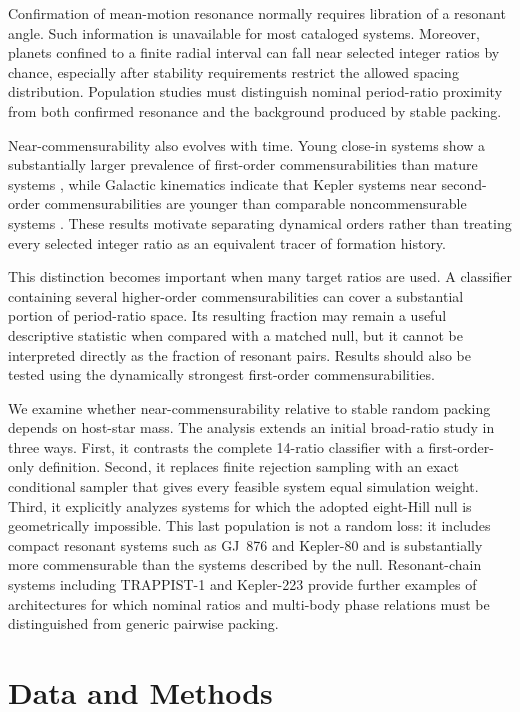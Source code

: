 \documentclass[twocolumn,linenumbers]{aastex631}
\begin{document}
Confirmation of mean-motion resonance normally requires libration of a
resonant angle. Such information is unavailable for most cataloged systems.
Moreover, planets confined to a finite radial interval can fall near selected
integer ratios by chance, especially after stability requirements restrict the
allowed spacing distribution. Population studies must distinguish nominal
period-ratio proximity from both confirmed resonance and the background
produced by stable packing.

Near-commensurability also evolves with time. Young close-in systems show a
substantially larger prevalence of first-order commensurabilities than mature
systems \citep{dai2024}, while Galactic kinematics indicate that Kepler
systems near second-order commensurabilities are younger than comparable
noncommensurable systems \citep{hamer2024}. These results motivate separating
dynamical orders rather than treating every selected integer ratio as an
equivalent tracer of formation history.

This distinction becomes important when many target ratios are used. A
classifier containing several higher-order commensurabilities can cover a
substantial portion of period-ratio space. Its resulting fraction may remain a
useful descriptive statistic when compared with a matched null, but it cannot
be interpreted directly as the fraction of resonant pairs. Results should also
be tested using the dynamically strongest first-order commensurabilities.

We examine whether near-commensurability relative to stable random packing
depends on host-star mass. The analysis extends an initial broad-ratio study in
three ways. First, it contrasts the complete 14-ratio classifier with a
first-order-only definition. Second, it replaces finite rejection sampling with
an exact conditional sampler that gives every feasible system equal simulation
weight. Third, it explicitly analyzes systems for which the adopted eight-Hill
null is geometrically impossible. This last population is not a random loss:
it includes compact resonant systems such as GJ~876 \citep{rivera2010} and
Kepler-80 \citep{macdonald2016} and is substantially more commensurable than
the systems described by the null. Resonant-chain systems including
TRAPPIST-1 \citep{luger2017} and Kepler-223 \citep{mills2016} provide further
examples of architectures for which nominal ratios and multi-body phase
relations must be distinguished from generic pairwise packing.

\section{Data and Methods}
\end{document}
